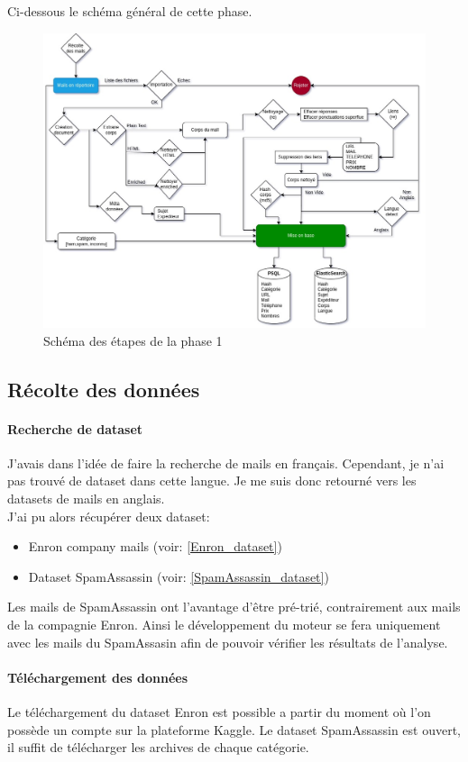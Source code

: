 \documentclass[a4paper,12pt]{article}
\begin{document}
	Ci-dessous le schéma général de cette phase.
	\begin{figure}[H]
		\includegraphics[width=\linewidth]{img/SchemaPhase1.jpg}
		\caption{Schéma des étapes de la phase 1}
	\end{figure}


	\subsection{Récolte des données}
		\paragraph{Recherche de dataset}
			J'avais dans l'idée de faire la recherche de mails en français. Cependant, je n'ai pas trouvé de dataset dans cette langue. Je me suis donc retourné vers les datasets de mails en anglais. \\
			J'ai pu alors récupérer deux dataset:
			\begin{itemize}
				\item Enron company mails (voir: \ref{Enron_dataset})
				\item Dataset SpamAssassin (voir: \ref{SpamAssassin_dataset})
			\end{itemize}
			Les mails de SpamAssassin ont l'avantage d'être pré-trié, contrairement aux mails de la compagnie Enron. Ainsi le développement du moteur se fera uniquement avec les mails du SpamAssasin afin de pouvoir vérifier les résultats de l'analyse. 
		
		\paragraph{Téléchargement des données}
			Le téléchargement du dataset Enron est possible a partir du moment où l'on possède un compte sur la plateforme Kaggle. Le dataset SpamAssassin est ouvert, il suffit de télécharger les archives de chaque catégorie. \\
			
\end{document}
